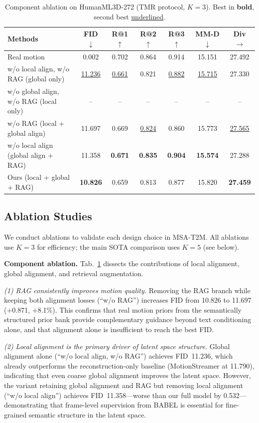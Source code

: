 \documentclass{article}
\begin{document}
\begin{table}[t]
\centering
\caption{Component ablation on HumanML3D-272 (TMR protocol, $K{=}3$). Best in \textbf{bold}, second best \underline{underlined}.}
\label{tab:ablation}
\begin{tabular}{lcccccc}
\toprule
Methods & FID $\downarrow$ & R@1 $\uparrow$ & R@2 $\uparrow$ & R@3 $\uparrow$ & MM-D $\downarrow$ & Div $\rightarrow$ \\
\midrule
Real motion & 0.002 & 0.702 & 0.864 & 0.914 & 15.151 & 27.492 \\
\midrule
w/o local align, w/o RAG (global only) & \underline{11.236} & \underline{0.661} & 0.821 & \underline{0.882} & \underline{15.715} & 27.330 \\
w/o global align, w/o RAG (local only) & -- & -- & -- & -- & -- & -- \\
w/o RAG (local + global align) & 11.697 & 0.669 & \underline{0.824} & 0.860 & 15.773 & \underline{27.565} \\
w/o local align (global align + RAG) & 11.358 & \textbf{0.671} & \textbf{0.835} & \textbf{0.904} & \textbf{15.574} & 27.288 \\
Ours (local + global + RAG) & \textbf{10.826} & 0.659 & 0.813 & 0.877 & 15.820 & \textbf{27.459} \\
\bottomrule
\end{tabular}
\end{table}


\subsection{Ablation Studies}

We conduct ablations to validate each design choice in MSA-T2M.
All ablations use \(K{=}3\) for efficiency; the main SOTA comparison uses \(K{=}5\) (see below).

\textbf{Component ablation.}
Tab.~\ref{tab:ablation} dissects the contributions of local alignment, global alignment, and retrieval augmentation.

\textit{(1) RAG consistently improves motion quality.}
Removing the RAG branch while keeping both alignment losses (``w/o RAG'') increases FID from 10.826 to 11.697 (+0.871, $+$8.1\%).
This confirms that real motion priors from the semantically structured prior bank provide complementary guidance beyond text conditioning alone, and that alignment alone is insufficient to reach the best FID.

\textit{(2) Local alignment is the primary driver of latent space structure.}
Global alignment alone (``w/o local align, w/o RAG'') achieves FID~11.236, which already outperforms the reconstruction-only baseline (MotionStreamer at 11.790), indicating that even coarse global alignment improves the latent space.
However, the variant retaining global alignment and RAG but removing local alignment (``w/o local align'') achieves FID~11.358---worse than our full model by 0.532---demonstrating that frame-level supervision from BABEL is essential for fine-grained semantic structure in the latent space.
\end{document}
